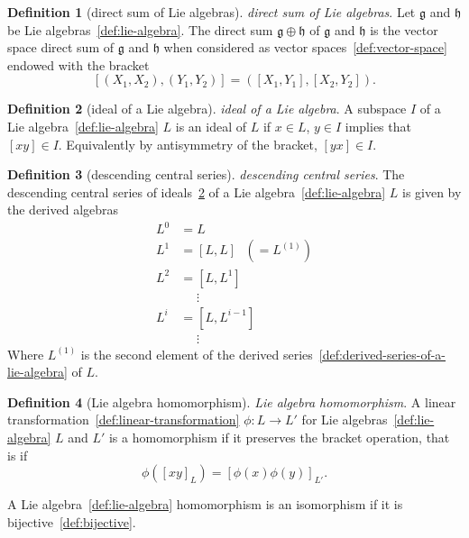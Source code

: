 \documentclass[12pt,a4paper]{article}
\theoremstyle{definition}
\newtheorem{definition}{Definition}
\begin{document}
\begin{definition}[direct sum of Lie algebras]\label{def:direct-sum-of-lie-algebras}
\emph{direct sum of Lie algebras}. Let $\mathfrak g$ and $\mathfrak h$ be Lie algebras~\ref{def:lie-algebra}. The direct sum $\mathfrak g \oplus \mathfrak h$ of $\mathfrak g$ and $\mathfrak h$ is the vector space direct sum of $\mathfrak g$ and $\mathfrak h$ when considered as vector spaces~\ref{def:vector-space} endowed with the bracket $$[(X_1,X_2),(Y_1,Y_2)]=([X_1,Y_1],[X_2,Y_2]).$$
\end{definition}

\begin{definition}[ideal of a Lie algebra]\label{def:ideal-of-a-lie-algebra}
\emph{ideal of a Lie algebra}. A subspace $I$ of a Lie algebra~\ref{def:lie-algebra} $L$ is an ideal of $L$ if $x\in L$, $y\in I$ implies that $[xy]\in I$. Equivalently by antisymmetry of the bracket, $[yx] \in I$.
\end{definition}

\begin{definition}[descending central series]\label{def:descending-central-series}
\emph{descending central series}. The descending central series of ideals~\ref{def:ideal-of-a-lie-algebra} of a Lie algebra~\ref{def:lie-algebra} $L$ is given by the derived algebras $$\begin{align*}L^0 &= L\\ L^1 &= [L,L]\text{ } (= L^{(1)})\\ L^2 &= [L,L^1]\\ &\text{ }\text{ } \vdots\\ L^i &= [L,L^{i-1}]\\&\text{ }\text{ } \vdots\end{align*}$$ Where $L^{(1)}$ is the second element of the derived series~\ref{def:derived-series-of-a-lie-algebra} of $L$.
\end{definition}

\begin{definition}[Lie algebra homomorphism]\label{def:lie-algebra-homomorphism}
\emph{Lie algebra homomorphism}. A linear transformation~\ref{def:linear-transformation} $\phi:L \to L'$ for Lie algebras~\ref{def:lie-algebra} $L$ and $L'$ is a homomorphism if it preserves the bracket operation, that is if $$\phi([xy]_L) = [\phi(x)\phi(y)]_{L'}.$$

A Lie algebra~\ref{def:lie-algebra} homomorphism is an isomorphism if it is bijective~\ref{def:bijective}.
\end{definition}
\end{document}
